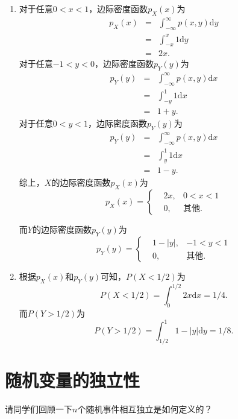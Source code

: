 \begin{solution}
        \begin{enumerate}
        \item 对于任意$0<x<1$，边际密度函数$p_X(x)$为
        \begin{eqnarray*}
            p_X(x) &=& \int_{-\infty}^{\infty} p(x,y) \text{d}y\\
            &=& \int_{-x}^{x} 1 \text{d}y\\
            &=& 2x.
        \end{eqnarray*}
对于任意$-1<y<0$，边际密度函数$p_Y(y)$为
        \begin{eqnarray*}
            p_Y(y) &=& \int_{-\infty}^{\infty} p(x,y) \text{d}x\\
            &=& \int_{-y}^{1} 1 \text{d}x\\
            &=& 1+y.
        \end{eqnarray*}
对于任意$0<y<1$，边际密度函数$p_Y(y)$为
        \begin{eqnarray*}
            p_Y(y) &=& \int_{-\infty}^{\infty} p(x,y) \text{d}x\\
            &=& \int_{y}^{1} 1 \text{d}x\\
            &=& 1-y.
        \end{eqnarray*}   
综上，$X$的边际密度函数$p_X(x)$为
$$
p_X(x) = \left\{\begin{aligned}
    & 2x, & 0<x <1 \\
    &0 ,  & \text{其他}.
\end{aligned}
\right.
$$

而$Y$的边际密度函数$p_Y(y)$为
$$
p_Y(y) = \left\{\begin{aligned}
    & 1-|y|, & -1<y <1 \\
    &0 ,  & \text{其他}.
\end{aligned}
\right.
$$
\item 根据$p_X(x)$和$p_Y(y)$可知，$P(X<1/2)$为
$$
P(X<1/2) = \int_{0}^{1/2}2x \text{d}x = 1/4.
$$
而$P(Y>1/2)$为
$$
P(Y>1/2) = \int_{1/2}^{1}1-|y| \text{d}y = 1/8.
$$
    \end{enumerate}
\end{solution}



 \section{随机变量的独立性}
 \begin{problem}
     请同学们回顾一下$n$个随机事件相互独立是如何定义的？
 \end{problem}
 
